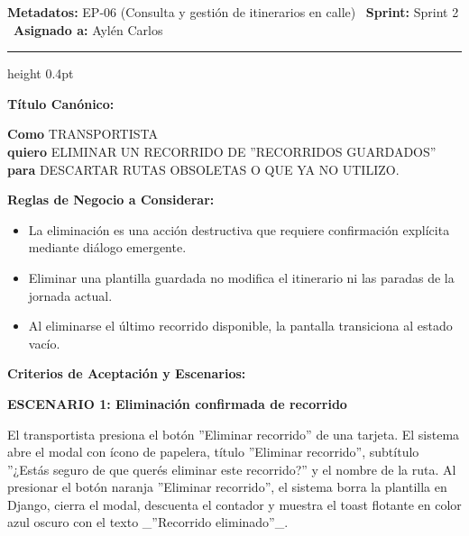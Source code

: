 \documentclass[a4paper,9pt]{article}
\begin{document}
\begin{tcolorbox}[hucard, title={\textbf{HU-65: ELIMINAR RECORRIDO} \hfill \scriptsize \colorbox{tealstatus}{\textbf{\ Accepted\ }} \quad \colorbox{white}{\textcolor{primarydark}{\textbf{\ 1 pt\ }}}}]
\vspace{-1pt}
\noindent\textbf{\footnotesize Metadatos:} EP-06 (Consulta y gestión de itinerarios en calle) \textbar\ \textbf{Sprint:} Sprint 2 \textbar\ \textbf{Asignado a:} Aylén Carlos\par\vspace{2pt}
\hrule height 0.4pt\par\vspace{3pt}
\noindent\textbf{\footnotesize Título Canónico:}\par\vspace{1pt}
{\small \textbf{Como} TRANSPORTISTA \\ \textbf{quiero} ELIMINAR UN RECORRIDO DE ''RECORRIDOS GUARDADOS'' \\ \textbf{para} DESCARTAR RUTAS OBSOLETAS O QUE YA NO UTILIZO.}\par\vspace{3pt}
\noindent\textbf{\footnotesize Reglas de Negocio a Considerar:}\par\vspace{1pt}
{\footnotesize
\begin{itemize}[leftmargin=12pt, nosep, itemsep=1.5pt, topsep=1pt]
\item La eliminación es una acción destructiva que requiere confirmación explícita mediante diálogo emergente.
\item Eliminar una plantilla guardada no modifica el itinerario ni las paradas de la jornada actual.
\item Al eliminarse el último recorrido disponible, la pantalla transiciona al estado vacío.
\end{itemize}
}\par\vspace{3pt}
\noindent\textbf{\footnotesize Criterios de Aceptación y Escenarios:}\par\vspace{2pt}
{\footnotesize
\noindent\textbf{\textcolor{secondarydark}{ESCENARIO 1:  Eliminación confirmada de recorrido}}\par\vspace{1pt}
El transportista presiona el botón ''Eliminar recorrido'' de una tarjeta. El sistema abre el modal con ícono de papelera, título ''Eliminar recorrido'', subtítulo ''¿Estás seguro de que querés eliminar este recorrido?'' y el nombre de la ruta. Al presionar el botón naranja ''Eliminar recorrido'', el sistema borra la plantilla en Django, cierra el modal, descuenta el contador y muestra el toast flotante en color azul oscuro con el texto \_''Recorrido eliminado''\_.\par\vspace{2.5pt}
}
\end{tcolorbox}
\end{document}
